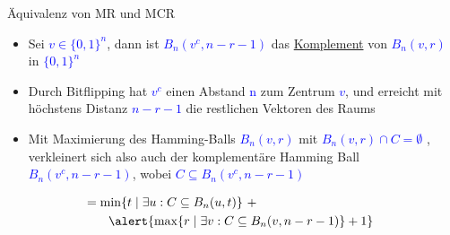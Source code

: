 \documentclass[10pt, aspectratio=169]{beamer}
\begin{document}
\begin{frame}{Äquivalenz von MR und MCR}
\vspace{2em}
\begin{itemize}
    \item Sei \textcolor{blue}{$v \in \{0,1\}^n$}, dann ist \textcolor{blue}{$B_n(v^c,n-r-1)$} das \hyperlink{Kompl}{Komplement} von \textcolor{blue}{$B_n(v,r)$} in \textcolor{blue}{$\{0,1\}^n$}
    
    \item Durch \alert{Bitflipping} hat \textcolor{blue}{ $v^c$} einen Abstand \textcolor{blue}{n} zum Zentrum \textcolor{blue}{$v$}, und erreicht mit höchstens Distanz \textcolor{blue}{$n-r-1$} die restlichen Vektoren des Raums
     \item  Mit \alert{Maximierung} des Hamming-Balls \textcolor{blue}{$B_n(v,r)$} mit \textcolor{blue}{$B_n(v,r)\cap C = \emptyset$}
     , \alert{verkleinert} sich also auch der komplementäre Hamming Ball \textcolor{blue}{$B_n(v^c,n-r-1)$}, wobei \textcolor{blue}{$C \subseteq B_n(v^c,n-r-1)$}
     
\end{itemize}

\vspace{2em}
\textcolor{blue}{
$\begin{aligned}
  \qquad \qquad \qquad &=  \min\{t \mid \exists u: C \subseteq B_n(u,t)\}\ + \\ 
   &\qquad \alert{\max\{r \mid \exists v: C \subseteq B_n(v,n-r-1)\}+1} \\
\end{aligned}$
}
\end{frame}
\end{document}
